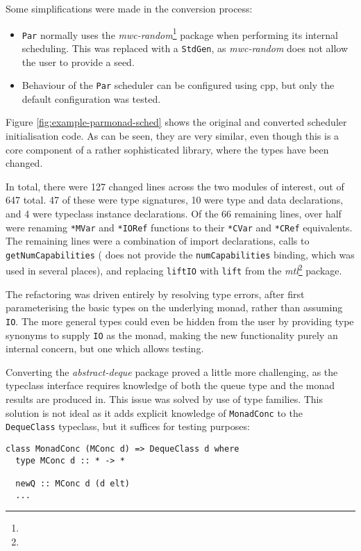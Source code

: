 Some simplifications were made in the conversion process:

\begin{itemize}
\item \verb|Par| normally uses the
  \emph{mwc-random}\footnote{} package when
  performing its internal scheduling. This was replaced with a
  \verb|StdGen|, as \emph{mwc-random} does not allow the user to
  provide a seed.

\item Behaviour of the \verb|Par| scheduler can be configured using
  cpp, but only the default configuration was tested.
\end{itemize}

Figure \ref{fig:example-parmonad-sched} shows the original and
converted scheduler initialisation code. As can be seen, they are very
similar, even though this is a core component of a rather
sophisticated library, where the types have been changed.

In total, there were 127 changed lines across the two modules of
interest, out of 647 total. 47 of these were type signatures, 10 were
type and data declarations, and 4 were typeclass instance
declarations. Of the 66 remaining lines, over half were renaming
\verb|*MVar| and \verb|*IORef| functions to their \verb|*CVar| and
\verb|*CRef| equivalents. The remaining lines were a combination of
import declarations, calls to \verb|getNumCapabilities| (\dejafu{}
does not provide the \verb|numCapabilities| binding, which was used in
several places), and replacing \verb|liftIO| with \verb|lift| from the
\emph{mtl}\footnote{} package.

The refactoring was driven entirely by resolving type errors, after
first parameterising the basic types on the underlying monad, rather
than assuming \verb|IO|. The more general types could even be hidden
from the user by providing type synonyms to supply \verb|IO| as the
monad, making the new functionality purely an internal concern, but
one which allows testing.

Converting the \emph{abstract-deque} package proved a little more
challenging, as the typeclass interface requires knowledge of both the
queue type and the monad results are produced in. This issue was
solved by use of type families. This solution is not ideal as it adds
explicit knowledge of \verb|MonadConc| to the \verb|DequeClass|
typeclass, but it suffices for testing purposes:

\begin{verbatim}
class MonadConc (MConc d) => DequeClass d where
  type MConc d :: * -> *

  newQ :: MConc d (d elt)
  ...
\end{verbatim}


